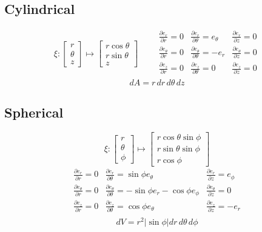 \documentclass[a4paper]{article}
\def\pp#1#2{\frac{\partial #1}{\partial #2}}
\begin{document}
\begin{multicols}{2}
	\subsection*{Cylindrical}
	\[
		\xi: \begin{bmatrix}
			r      \\
			\theta \\
			z
		\end{bmatrix} \mapsto \begin{bmatrix}
			r\cos\theta \\
			r\sin\theta \\
			z
		\end{bmatrix}
		\qquad
		\begin{array}{lll}
			\pp{e_r}{r} =0      & \pp{e_r}{\theta} =e_\theta  & \pp{e_r}{z} =0      \\
			\pp{e_\theta}{r} =0 & \pp{e_\theta}{\theta} =-e_r & \pp{e_\theta}{z} =0 \\
			\pp{e_z}{r} =0      & \pp{e_z}{\theta} =0         & \pp{e_z}{z} =0      \\
		\end{array}
	\]
	$$dA=r\,dr\,d\theta\,dz$$

	\subsection*{Spherical}
	\[
		\xi: \begin{bmatrix}
			r      \\
			\theta \\
			\phi
		\end{bmatrix}
		\mapsto
		\begin{bmatrix}
			r\cos\theta\sin\phi \\
			r\sin\theta\sin\phi \\
			r\cos\phi
		\end{bmatrix}
	\]
	\[
		\begin{array}{lll}
			\pp{e_r}{r}      =0 & \pp{e_r}{\theta} =\sin\phi e_\theta                   & \pp{e_r}{z} =e_\phi \\
			\pp{e_\theta}{r} =0 & \pp{e_\theta}{\theta} =-\sin\phi e_r -\cos\phi e_\phi & \pp{e_\theta}{z} =0 \\
			\pp{e_z}{r}      =0 & \pp{e_z}{\theta} =\cos\phi e_\theta                   & \pp{e_z}{z} =-e_r   \\
		\end{array}
	\]
	\[
		dV = r^2|\sin\phi|dr\,d\theta\,d\phi
	\]



\end{multicols}
\end{document}
